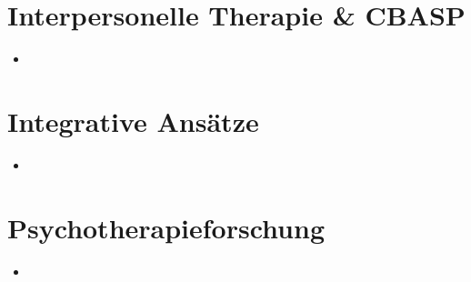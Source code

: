 \documentclass[11pt, paper=a4, twocolumn]{scrartcl}
\begin{document}
	\section{Interpersonelle Therapie \& CBASP}
		\begin{itemize}
			\item 
		\end{itemize}

	\section{Integrative Ansätze}
		\begin{itemize}
			\item 
		\end{itemize}

	\section{Psychotherapieforschung}
		\begin{itemize}
			\item 
		\end{itemize}
\end{document}
